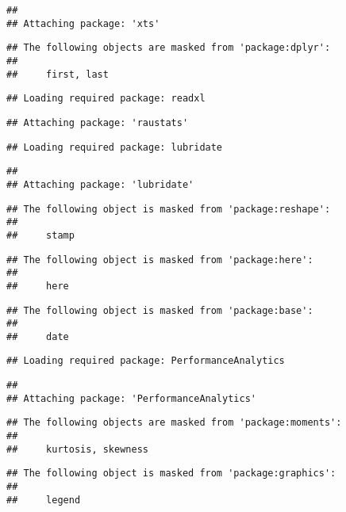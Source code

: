 \documentclass[]{article}
\begin{document}
\begin{verbatim}
## 
## Attaching package: 'xts'
\end{verbatim}

\begin{verbatim}
## The following objects are masked from 'package:dplyr':
## 
##     first, last
\end{verbatim}

\begin{verbatim}
## Loading required package: readxl
\end{verbatim}

\begin{verbatim}
## Attaching package: 'raustats'
\end{verbatim}

\begin{verbatim}
## Loading required package: lubridate
\end{verbatim}

\begin{verbatim}
## 
## Attaching package: 'lubridate'
\end{verbatim}

\begin{verbatim}
## The following object is masked from 'package:reshape':
## 
##     stamp
\end{verbatim}

\begin{verbatim}
## The following object is masked from 'package:here':
## 
##     here
\end{verbatim}

\begin{verbatim}
## The following object is masked from 'package:base':
## 
##     date
\end{verbatim}

\begin{verbatim}
## Loading required package: PerformanceAnalytics
\end{verbatim}

\begin{verbatim}
## 
## Attaching package: 'PerformanceAnalytics'
\end{verbatim}

\begin{verbatim}
## The following objects are masked from 'package:moments':
## 
##     kurtosis, skewness
\end{verbatim}

\begin{verbatim}
## The following object is masked from 'package:graphics':
## 
##     legend
\end{verbatim}
\end{document}
